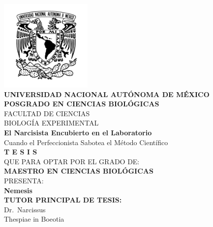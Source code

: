 \documentclass[
  10pt]{article}
\begin{document}
\begin{titlepage}
    \begin{center}
        \vspace*{-0.5cm} %
        
        \includegraphics[width=4.5cm]{ figuras/unam.png }\\[0.5cm]
        
        {\large \textbf{UNIVERSIDAD NACIONAL AUTÓNOMA DE MÉXICO}}\\[0.4cm]
        
        {\large \textbf{\MakeUppercase{Posgrado en Ciencias
Biológicas}}}\\[1cm]
        
        {\large \MakeUppercase{Facultad de Ciencias}}\\[0.4cm]
        {\large \MakeUppercase{Biología Experimental}}\\[1.2cm]
        
        {\Large \textbf{El Narcisista Encubierto en el
Laboratorio}}\\[0.3cm]
        {\small  Cuando el Perfeccionista Sabotea el Método
Científico }\\[0.6cm]
        
        {\LARGE \textbf{T E S I S}}\\[1cm]
        
        {\large QUE PARA OPTAR POR EL GRADO DE:}\\[0.15cm]
        {\Large \textbf{MAESTRO EN CIENCIAS BIOLÓGICAS}}\\[0.8cm]
        
        {\large PRESENTA:}\\[0.3cm]
        {\LARGE \textbf{Nemesis}}\\[0.8cm]
        
        {\small \textbf{TUTOR PRINCIPAL DE TESIS:}}\\
        {\small  Dr.~Narcissus }\\
        {\small  Thespiae in Boeotia }\\[0.5cm]
        

\end{center}
\end{titlepage}
\end{document}
